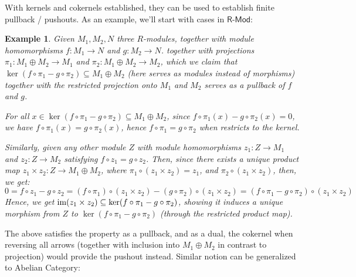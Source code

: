 \documentclass[x11names,reqno,12pt]{extarticle}
\newtheorem{exm}{Example}
\newcommand{\cat}[1]{\textsf{#1}}
\begin{document}
\hfil

With kernels and cokernels established, they can be used to establish finite pullback / pushouts. As an example, we'll start with cases in $\cat{R-Mod}$:
\begin{exm}
    Given $M_1,M_2,N$ three $R$-modules, together with module homomorphisms $f:M_1\rightarrow N$ and $g:M_2\rightarrow N$. together with projections $\pi_1:M_1\oplus M_2\rightarrow M_1$ and $\pi_2:M_1\oplus M_2\rightarrow M_2$, which we claim that $\ker(f\circ \pi_1 - g\circ \pi_2)\subseteq M_1\oplus M_2$ (here serves as modules instead of morphisms) together with the restricted projection onto $M_1$ and $M_2$ serves as a pullback of $f$ and $g$.

    For all $x\in \ker(f\circ \pi_1-g\circ\pi_2)\subseteq M_1\oplus M_2$, since $f\circ \pi_1(x)-g\circ\pi_2(x)=0$, we have $f\circ\pi_1(x)=g\circ\pi_2(x)$, hence $f\circ \pi_1=g\circ\pi_2$ when restricts to the kernel.

    Similarly, given any other module $Z$ with module homomorphisms $z_1:Z\rightarrow M_1$ and $z_2:Z\rightarrow M_2$ satisfying $f\circ z_1=g\circ z_2$. Then, since there exists a unique product map $z_1\times z_2:Z\rightarrow M_1\oplus M_2$, where $\pi_1\circ (z_1\times z_2)=z_1$, and $\pi_2\circ (z_1\times z_2)$, then, we get:
    $$0=f\circ z_1-g\circ z_2 = (f\circ \pi_1)\circ (z_1\times z_2)-(g\circ \pi_2)\circ (z_1\times z_2) = (f\circ \pi_1-g\circ \pi_2)\circ (z_1\times z_2)$$
    Hence, we get $\textmd{im}(z_1\times z_2)\subseteq \ker(f\circ \pi_1-g\circ \pi_2)$, showing it induces a unique morphism from $Z$ to $\ker(f\circ \pi_1-g\circ \pi_2)$ (through the restricted product map).
\end{exm}

The above satisfies the property as a pullback, and as a dual, the cokernel when reversing all arrows (together with inclusion into $M_1\oplus M_2$ in contrast to projection) would provide the pushout instead. Similar notion can be generalized to Abelian Category:
\end{document}
